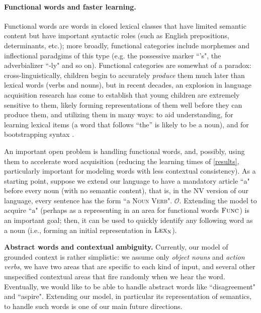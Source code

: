 \documentclass{article}
\newcommand{\LexN}{\textsc{Lex}_{\textsc{N}}}
\begin{document}
\paragraph{Functional words and faster learning.}
Functional words are words in closed lexical classes that have limited semantic content but have important syntactic roles (such as English prepositions, determinants, etc.); more broadly, functional categories include morphemes and inflectional paradgims of this type (e.g. the possessive marker ``'s", the adverbializer ``-ly" and so on). Functional categories are somewhat of a paradox: cross-linguistically, children begin to accurately \emph{produce} them much later than lexical words (verbs and nouns), but in recent decades, an explosion in language acquisition research has come to establish that young children are extremely sensitive to them, likely forming representations of them well before they can produce them, and utilizing them in many ways: to aid understanding, for learning lexical items (a word that follows ``the'' is likely to be a noun), and for bootstrapping syntax \citep{lust}. 

An important open problem is handling functional words, and, possibly, using them to accelerate word acquisition (reducing the learning times of \ref{results}, particularly important for modeling words with less contextual consistency). As a starting point, suppose we extend our language to have a mandatory article ``a" before every noun (with no semantic content), that is, in the NV version of our language, every sentence has the form ``a \textsc{Noun} \textsc{Verb}". $\mathcal{O}$. Extending the model to acquire ``a" (perhaps as a representing in an area for functional words $\textsc{Func}$) is an important goal; then, it can be used to quickly identify any following word as a noun (i.e., forming an initial representation in $\LexN$).

\textbf{Abstract words and contextual ambiguity.}
Currently, our model of grounded context is rather simplistic: we assume only \emph{object nouns} and \emph{action verbs}, we have two areas that are specific to each kind of input, and several other unspecified contextual areas that fire randomly when we hear the word. Eventually, we would like to be able to handle abstract words like ``disagreement" and ``aspire". Extending our model, in particular its representation of semantics, to handle such words is one of our main future directions.
\end{document}
